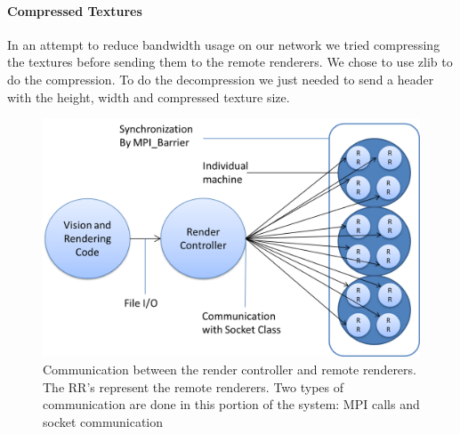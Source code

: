 \paragraph{Compressed Textures}
In an attempt to reduce bandwidth usage on our network we tried compressing the textures before sending them to the remote renderers.  We chose to use zlib to do the compression.  To do the decompression we just needed to send a header with the height, width and compressed texture size.

 \begin{figure}[t]
    \includegraphics[width=120mm]{images/MPI_socket_diagram.png}%
  \caption[Communication diagram of the Virtual Heliodon System]{ 
%
Communication between the render controller and remote renderers.  The RR's represent the remote renderers.  
Two types of communication are done in this portion of the system: MPI calls and socket communication}
\vspace{-0.15in}
\label{FIGURE:block_diagram}
\end{figure}



